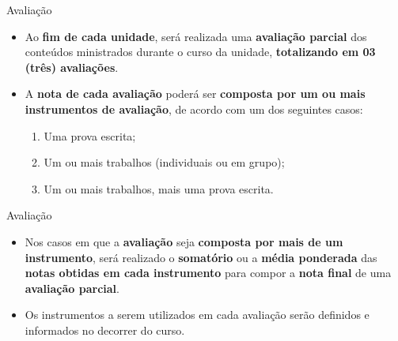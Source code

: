 \documentclass{beamer}
\begin{document}
\begin{frame}{Avaliação}
    \begin{itemize}
        \justifying
        \item Ao \textbf{fim de cada unidade}, será realizada uma \textbf{avaliação parcial} dos conteúdos ministrados durante o curso da unidade, \alert{\textbf{totalizando em 03 (três) avaliações}}.
        \item A \textbf{nota de cada avaliação} poderá ser \textbf{composta por um ou mais instrumentos de avaliação}, de acordo com um dos seguintes casos:
        \begin{enumerate}
            \justifying
            \item Uma prova escrita;
            \item Um ou mais trabalhos (individuais ou em grupo);
            \item Um ou mais trabalhos, mais uma prova escrita.
        \end{enumerate}
    \end{itemize}
\end{frame}

\begin{frame}{Avaliação}
    \begin{itemize}
        \justifying
        \item Nos casos em que a \textbf{avaliação} seja \textbf{composta por mais de um instrumento}, será realizado o \textbf{somatório} ou a \textbf{média ponderada} das \textbf{notas obtidas em cada instrumento} para compor a \textbf{nota final} de uma \textbf{avaliação parcial}.
        \item Os instrumentos a serem utilizados em cada avaliação serão definidos e informados no decorrer do curso.
    \end{itemize}
\end{frame}
\end{document}
